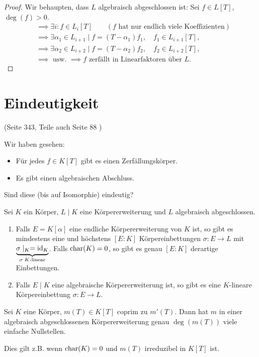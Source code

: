 \begin{proof}
		Wir behaupten, dass $L$ algebraisch abgeschlossen ist: Sei $f \in L[T]$, $\deg(f) > 0$.
		\begin{align*}
			&\implies \exists i : f \in L_{i}[T] \qquad (f \text{ hat nur endlich viele Koeffizienten})\\
			&\implies \exists \alpha_1 \in L_{i+1} \mid f = (T-\alpha_1) f_1, \quad f_1 \in L_{i+1}[T],\\
			&\implies \exists \alpha_2 \in L_{i+2} \mid f = (T-\alpha_2) f_2, \quad f_2 \in L_{i+2}[T],\\
			&\implies \text{ usw. } \implies f \text{ zerfällt in Linearfaktoren über } L.
		\end{align*}
\end{proof}

\section{Eindeutigkeit}
(Seite $343$, Teile auch Seite $88$ )

Wir haben gesehen: 
\begin{itemize}
	\item Für jedes $f \in K[T]$ gibt es einen Zerfällungskörper.
	\item Es gibt einen algebraischen Abschluss.
\end{itemize}
Sind diese (bis auf Isomorphie) eindeutig?

\begin{theorem}
	Sei $K$ ein Körper, $L \mid K$ eine Körpererweiterung und $L$ algebraisch abgeschlossen.
	\begin{enumerate}
		\item Falls $E = K[\alpha]$ eine endliche Körpererweiterung von $K$ ist, so gibt es mindestens eine
			und höchstens $[E:K]$ Körpereinbettungen $\sigma: E \to L$ mit $\underbrace{\sigma \mid_{K} = \operatorname{id}_{K}}_{\sigma \; K\text{-linear}}$.
			Falls $\operatorname{char}(K)=0$, so gibt es genau $[E:K]$ derartige Einbettungen.
		\item Falls $E \mid K$ eine algebraische Körpererweiterung ist, so gibt es eine $K$-lineare Körpereinbettung
			$\sigma: E \to L$.
	\end{enumerate}
\end{theorem}

\begin{lemma}
	Sei $K$ eine Körper, $m(T) \in K[T]$ coprim zu $m'(T)$. Dann hat $m$ in einer algebraisch abgeschlossenen Körpererweiterung
	genau $\deg(m(T))$ viele einfache Nullstellen.

	Dies gilt z.B. wenn $\operatorname{char}(K) = 0$ und $m(T)$ irreduzibel in $K[T]$ ist.
\end{lemma}

